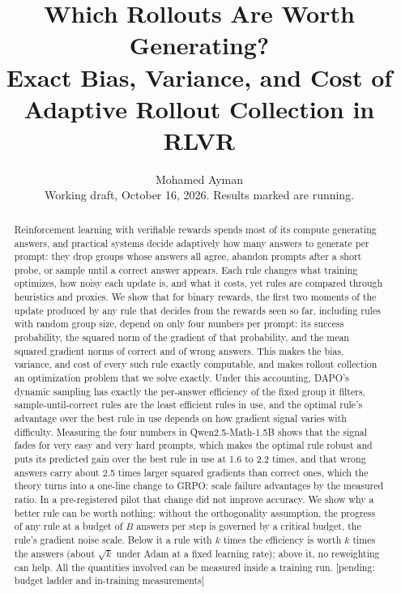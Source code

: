 \documentclass[11pt]{article}
\title{\textbf{Which Rollouts Are Worth Generating?}\\[4pt]
\large Exact Bias, Variance, and Cost of Adaptive Rollout Collection in RLVR}
\author{Mohamed Ayman\\\small Working draft, October 16, 2026. Results marked \pending{} are running.}
\date{}
\newcommand{\pending}[1]{\textcolor{red!60!black}{[pending: #1]}}
\begin{document}
\maketitle

\begin{abstract}
Reinforcement learning with verifiable rewards spends most of its compute generating answers, and practical systems decide adaptively how many answers to generate per prompt: they drop groups whose answers all agree, abandon prompts after a short probe, or sample until a correct answer appears. Each rule changes what training optimizes, how noisy each update is, and what it costs, yet rules are compared through heuristics and proxies. We show that for binary rewards, the first two moments of the update produced by any rule that decides from the rewards seen so far, including rules with random group size, depend on only four numbers per prompt: its success probability, the squared norm of the gradient of that probability, and the mean squared gradient norms of correct and of wrong answers. This makes the bias, variance, and cost of every such rule exactly computable, and makes rollout collection an optimization problem that we solve exactly. Under this accounting, DAPO's dynamic sampling has exactly the per-answer efficiency of the fixed group it filters, sample-until-correct rules are the least efficient rules in use, and the optimal rule's advantage over the best rule in use depends on how gradient signal varies with difficulty. Measuring the four numbers in Qwen2.5-Math-1.5B shows that the signal fades for very easy and very hard prompts, which makes the optimal rule robust and puts its predicted gain over the best rule in use at 1.6 to 2.2 times, and that wrong answers carry about 2.5 times larger squared gradients than correct ones, which the theory turns into a one-line change to GRPO: scale failure advantages by the measured ratio. In a pre-registered pilot that change did not improve accuracy. We show why a better rule can be worth nothing: without the orthogonality assumption, the progress of any rule at a budget of $B$ answers per step is governed by a critical budget, the rule's gradient noise scale. Below it a rule with $k$ times the efficiency is worth $k$ times the answers (about $\sqrt k$ under Adam at a fixed learning rate); above it, no reweighting can help. All the quantities involved can be measured inside a training run. \pending{budget ladder and in-training measurements}
\end{abstract}
\end{document}
